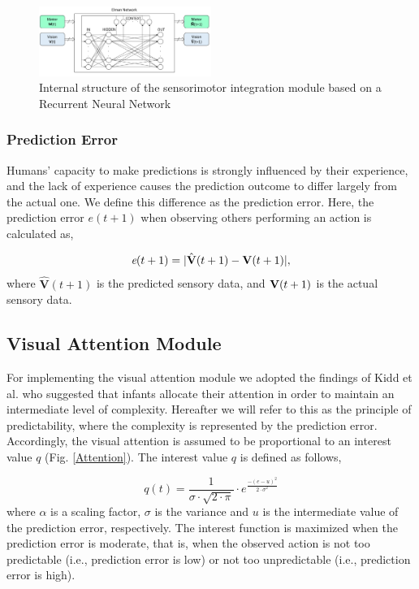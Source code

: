 \documentclass[conference]{IEEEtran}
\begin{document}
\begin{figure}[!t]
\centering
\includegraphics[width=0.5\textwidth,natwidth=700,natheight=450]{Elman_Network.png}
\caption{Internal structure of the sensorimotor integration module based on a Recurrent Neural Network}
\label{NeuralNet}
\end{figure}

\subsubsection{Prediction Error}
 Humans' capacity to make predictions is strongly influenced by their experience, and the lack of experience causes the prediction outcome to differ largely from the actual one. We define this difference as the prediction error. Here, the prediction error \(\textit{e}(t+1)\) when observing others performing an action is calculated as,

\begin{equation}
\begin{split}
	\textit{e}(t+1)=|\hat{\textbf{V}}(t+1)-\text{\textbf{V}}(t+1)|,\\
\end{split}
\end{equation}
where \(\hat{\textbf{V}}(t+1)\) is the predicted sensory data, and \(\text{\textbf{V}}(t+1)\) is the actual sensory data.

\subsection{Visual Attention Module}
For implementing the visual attention module we adopted the findings of Kidd et al. \cite{kidd2012goldilocks} who suggested that infants allocate their attention in order to maintain an intermediate level of complexity. Hereafter we will refer to this as the principle of predictability, where the complexity is represented by the prediction error. Accordingly, the visual attention is assumed to be proportional to an interest value \(\textit{q}\) (Fig. \ref{Attention}). The interest value \(\textit{q}\) is defined as follows,

\begin{equation}
  \textit{q}(t) = \frac{1}{\sigma\cdot \sqrt{2\cdot\pi}}\cdot e^{\frac{-(\textit{e}-\textit{u})^2}{2\cdot\sigma^2}}
  \label{gaussian}
\end{equation}
where \(\alpha\) is a scaling factor, \(\sigma\) is the variance and \(\textit{u}\) is the intermediate value of the prediction error, respectively. The interest function is maximized when the prediction error is moderate, that is, when the observed action is not too predictable (i.e., prediction error is low) or not too unpredictable (i.e., prediction error is high). 
\end{document}
